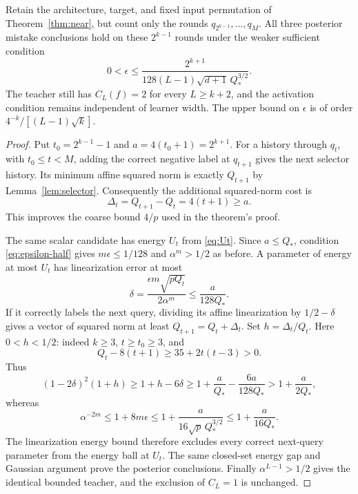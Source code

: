 \begin{corollary}
\label{cor:near-half}
Retain the architecture, target, and fixed input permutation of
Theorem~\ref{thm:near}, but count only the rounds
$q_{2^{k-1}},\ldots,q_M$. All three posterior mistake conclusions hold
on these $2^{k-1}$ rounds under the weaker sufficient condition
\begin{equation}\label{eq:epsilon-half}
 0<\epsilon\le
 \frac{2^{k+1}}{128(L-1)\sqrt{d+1}\,Q_*^{3/2}}.
\end{equation}
The teacher still has $C_L(f)=2$ for every $L\ge k+2$, and the
activation condition remains independent of learner width. The upper
bound on $\epsilon$ is of order $4^{-k}/[(L-1)\sqrt{k}]$.
\end{corollary}
\begin{proof}
Put $t_0=2^{k-1}-1$ and $a=4(t_0+1)=2^{k+1}$. For a history through
$q_t$, with $t_0\le t<M$, adding the correct negative label at
$q_{t+1}$ gives the next selector history. Its minimum affine
squared norm is exactly $Q_{t+1}$ by Lemma~\ref{lem:selector}.
Consequently the additional squared-norm cost is
\[
 \Delta_t=Q_{t+1}-Q_t=4(t+1)\ge a.
\]
This improves the coarse bound $4/p$ used in the theorem's proof.

The same scalar candidate has energy $U_t$ from \eqref{eq:Ut}.
Since $a\le Q_*$, condition \eqref{eq:epsilon-half} gives
$m\epsilon\le1/128$ and $\alpha^m>1/2$ as before. A parameter of
energy at most $U_t$ has linearization error at most
\begin{equation}\label{eq:delta-half}
 \delta=\frac{\epsilon m\sqrt{pQ_t}}{2\alpha^m}
       \le\frac{a}{128Q_*}.
\end{equation}
If it correctly labels the next query, dividing its affine
linearization by $1/2-\delta$ gives a vector of squared norm at least
$Q_{t+1}=Q_t+\Delta_t$. Set $h=\Delta_t/Q_t$.
Here $0<h<1/2$: indeed $k\ge3$, $t\ge t_0\ge3$, and
\[
 Q_t-8(t+1)\ge35+2t(t-3)>0.
\]
Thus
\[
 (1-2\delta)^2(1+h)
 \ge1+h-6\delta
 \ge1+\frac{a}{Q_*}-\frac{6a}{128Q_*}
 >1+\frac{a}{2Q_*},
\]
whereas
\[
 \alpha^{-2m}\le1+8m\epsilon
 \le1+\frac{a}{16\sqrt p\,Q_*^{3/2}}
 \le1+\frac{a}{16Q_*}.
\]
The linearization energy bound therefore excludes every correct
next-query parameter from the energy ball at $U_t$. The same closed-set
energy gap and Gaussian argument prove the posterior conclusions.
Finally $\alpha^{L-1}>1/2$ gives the identical bounded teacher, and
the exclusion of $C_L=1$ is unchanged.
\end{proof}
